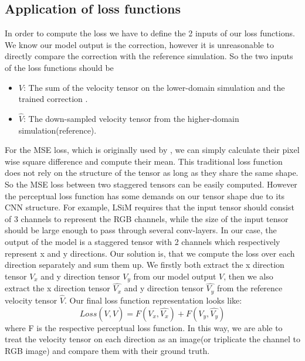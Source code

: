\documentclass[a4paper,12pt,twoside]{report}
\begin{document}
\subsection{Application of loss functions}
In order to compute the loss we have to define the 2 inputs of our loss functions. We know our model output is the correction, however it is unreasonable to directly compare the correction with the reference simulation. So the two inputs of the loss functions should be 
\begin{itemize}
\item $V$: The sum of the velocity tensor on the lower-domain simulation and the trained correction .

\item $\hat{V}$: The down-sampled velocity tensor from the higher-domain simulation(reference).
\end{itemize}


For the MSE loss, which is originally used by \citeauthor{um2020sol}, we can simply calculate their pixel wise square difference and compute their mean. This traditional loss function does not rely on the structure of the tensor as long as they share the same shape. So the MSE loss between two staggered tensors can be easily computed. However the perceptual loss function has some demands on our tensor shape due to its CNN structure. For example, LSiM requires that the input tensor should consist of 3 channels to represent the RGB channels, while the size of the input tensor should be large enough to pass through several conv-layers. In our case, the output of the model is a staggered tensor with 2 channels which respectively represent x and y directions. Our solution is, that we compute the loss over each direction separately and sum them up. We firstly both extract the x direction tensor $V_x$ and y direction tensor $V_y$ from our model output $V$, then we also extract the x direction tensor $\hat{V_x}$ and y direction tensor $\hat{V_y}$ from the reference velocity tensor $\hat{V}$. Our final loss function representation looks like:
\begin{equation}
 Loss(V, \hat{V}) = F(V_x, \hat{V_x}) + F(V_y, \hat{V_y})
\end{equation}
where F is the respective perceptual loss function. In this way, we are able to treat the velocity tensor on each direction as an image(or triplicate the channel to RGB image) and compare them with their ground truth.  
\end{document}
